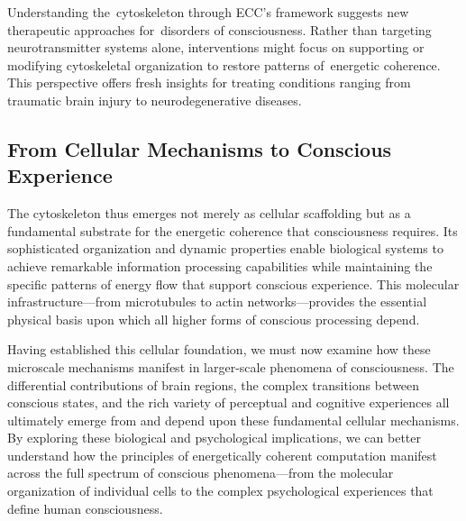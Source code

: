 Understanding the~cytoskeleton through ECC's framework suggests new therapeutic approaches for~disorders of consciousness. Rather than targeting neurotransmitter systems alone, interventions might focus on supporting or modifying cytoskeletal organization to restore patterns of~energetic coherence. This perspective offers fresh insights for treating conditions ranging from traumatic brain injury to neurodegenerative diseases.

\subsection*{From Cellular Mechanisms to Conscious Experience~~}

The cytoskeleton thus emerges not merely as cellular scaffolding but as a fundamental substrate for the energetic coherence that consciousness requires. Its sophisticated organization and dynamic properties enable biological systems to achieve remarkable information processing capabilities while maintaining the specific patterns of energy flow that support conscious experience. This molecular infrastructure—from microtubules to actin networks—provides the essential physical basis upon which all higher forms of conscious processing depend.

Having established this cellular foundation, we must now examine how these microscale mechanisms manifest in larger-scale phenomena of consciousness. The differential contributions of brain regions, the complex transitions between conscious states, and the rich variety of perceptual and cognitive experiences all ultimately emerge from and depend upon these fundamental cellular mechanisms. By exploring these biological and psychological implications, we can better understand how the principles of energetically coherent computation manifest across the full spectrum of conscious phenomena—from the molecular organization of individual cells to the complex psychological experiences that define human consciousness.
